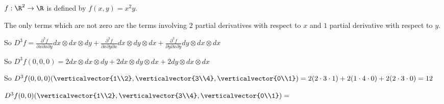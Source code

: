 \documentclass{ximera}
\begin{document}
\begin{question}
  $f:\R^2 \to \R$ is defined by $f(x,y) = x^2y$.  
  \begin{solution}
    \begin{hint}
      The only terms which are not zero are the terms involving $2$ partial derivatives with respect to $x$ and $1$ partial derivative with respect to $y$.
    \end{hint}
    \begin{hint}
      So $D^3f = \frac{\partial ^3 f}{\partial x \partial x \partial y} dx \otimes dx \otimes dy+ \frac{\partial ^3 f}{\partial x \partial y \partial x} dx \otimes dy \otimes dx+ \frac{\partial ^3 f}{\partial y \partial x \partial y} dy \otimes dx \otimes dx$
    \end{hint}
    \begin{hint}
      So $D^3f(0,0,0) = 2 dx\otimes dx \otimes dy+ 2 dx\otimes dy \otimes dx+2 dy\otimes dx \otimes dx$
    \end{hint}
    \begin{hint}
      So $D^3f(0,0,0)(\verticalvector{1\\2},\verticalvector{3\\4},\verticalvector{0\\1}) =2( 2 \cdot 3 \cdot 1)+2( 1 \cdot 4 \cdot 0)+2(2 \cdot 3 \cdot 0) = 12$
    \end{hint}
    $D^3f(0,0)(\verticalvector{1\\2},\verticalvector{3\\4},\verticalvector{0\\1})=$
  \end{solution}
\end{question}
\end{document}

